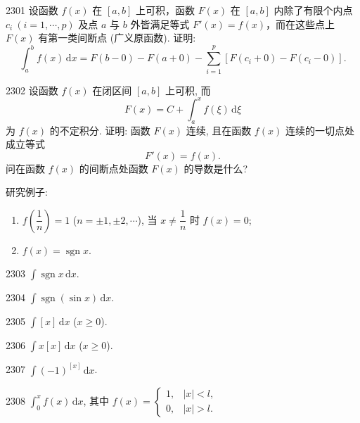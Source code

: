 \begin{prob}[M]{2301}
设函数 $f(x)$ 在 $[a, b]$ 上可积，函数 $F(x)$ 在 $[a, b]$ 内除了有限个内点 $c_i\ (i = 1, \cdots, p)$ 及点 $a$ 与 $b$ 外皆满足等式 $F'(x) = f(x)$，而在这些点上 $F(x)$ 有第一类间断点
(广义原函数). 证明:
\[
\int_{a}^{b} f(x)\,\mathrm{d}x = F(b-0) - F(a+0) - \sum_{i=1}^{p} [F(c_i+0) - F(c_i-0)].
\]
\end{prob}

\begin{prob}[L]{2302}
设函数 $f(x)$ 在闭区间 $[a, b]$ 上可积, 而
\[
F(x) = C + \int_{a}^{x} f(\xi)\,\mathrm{d}\xi
\]
为 $f(x)$ 的不定积分. 证明: 函数 $F(x)$ 连续, 且在函数 $f(x)$ 连续的一切点处成立等式
\[
F'(x) = f(x).
\]
问在函数 $f(x)$ 的间断点处函数 $F(x)$ 的导数是什么?

研究例子:
\begin{enumerate}[label=(\alph*), itemsep=2pt, topsep=3pt]
  \item $f\left(\dfrac{1}{n}\right) = 1$ ($n = \pm 1, \pm 2, \cdots$), 当 $x \neq \dfrac{1}{n}$ 时 $f(x) = 0$;
  \item $f(x) = \operatorname{sgn} x$.
\end{enumerate}
\end{prob}


\begin{prob}[S]{2303}
$\int \operatorname{sgn} x\,\mathrm{d}x$.
\end{prob}

\begin{prob}[S]{2304}
$\int \operatorname{sgn}(\sin x)\,\mathrm{d}x$.
\end{prob}

\begin{prob}[S]{2305}
$\int [x]\,\mathrm{d}x$ ($x \geqslant 0$).
\end{prob}

\begin{prob}[S]{2306}
$\int x[x]\,\mathrm{d}x$ ($x \geqslant 0$).
\end{prob}

\begin{prob}[S]{2307}
$\int (-1)^{[x]}\,\mathrm{d}x$.
\end{prob}

\begin{prob}[S]{2308}
$\int_{0}^{x} f(x)\,\mathrm{d}x$, 其中 $f(x) = \begin{cases} 1, & |x| < l, \\ 0, & |x| > l. \end{cases}$
\end{prob}

